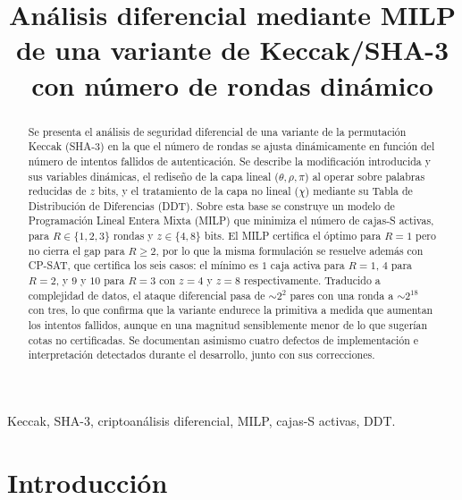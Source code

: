 \documentclass[conference]{IEEEtran}
\begin{document}
\title{Análisis diferencial mediante MILP de una variante de Keccak/SHA-3\\
con número de rondas dinámico}

\author{
}

\maketitle

\begin{abstract}
Se presenta el análisis de seguridad diferencial de una variante de la permutación
Keccak (SHA-3) en la que el número de rondas se ajusta dinámicamente en función del
número de intentos fallidos de autenticación. Se describe la modificación introducida
y sus variables dinámicas, el rediseño de la capa lineal ($\theta,\rho,\pi$) al operar
sobre palabras reducidas de $z$ bits, y el tratamiento de la capa no lineal ($\chi$)
mediante su Tabla de Distribución de Diferencias (DDT). Sobre esta base se construye un
modelo de Programación Lineal Entera Mixta (MILP) que minimiza el número de cajas-S
activas, para $R\in\{1,2,3\}$ rondas y $z\in\{4,8\}$ bits. El MILP certifica el óptimo
para $R=1$ pero no cierra el gap para $R\ge2$, por lo que la misma formulación se
resuelve además con CP-SAT, que certifica los seis casos: el mínimo es $1$ caja activa para
$R=1$, $4$ para $R=2$, y $9$ y $10$ para $R=3$ con $z=4$ y $z=8$ respectivamente. Traducido a complejidad de datos, el ataque
diferencial pasa de $\sim2^{2}$ pares con una ronda a $\sim2^{18}$ con tres, lo que
confirma que la variante endurece la primitiva a medida que aumentan los intentos
fallidos, aunque en una magnitud sensiblemente menor de lo que sugerían cotas no
certificadas. Se documentan asimismo cuatro defectos de implementación e interpretación
detectados durante el desarrollo, junto con sus correcciones.
\end{abstract}

\begin{IEEEkeywords}
Keccak, SHA-3, criptoanálisis diferencial, MILP, cajas-S activas, DDT.
\end{IEEEkeywords}

\section{Introducción}
\end{document}
